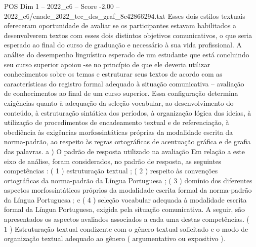 \begin{textsample}{POS Dim 1 – 2022\_c6 – Score -2.00 – 2022\_c6/enade\_2022\_tec\_des\_graf\_8c42866294.txt}
Esses dois estilos textuais ofereceram oportunidade de avaliar se os participantes estavam habilitados a desenvolverem textos com esses dois distintos objetivos comunicativos, o que seria esperado ao final do curso de graduação e necessário à sua vida profissional.
A análise do desempenho linguístico esperado de um estudante que está concluindo seu curso superior apoiou -se no princípio de que ele deveria utilizar conhecimentos sobre os temas e estruturar seus textos de acordo com as características do registro formal adequado à situação comunicativa – avaliação de conhecimentos ao final de um curso superior.
Essa configuração determina exigências quanto à adequação da seleção vocabular, ao desenvolvimento do conteúdo, à estruturação sintática dos períodos, à organização lógica das ideias, à utilização de procedimentos de encadeamento textual e de referenciação, à obediência às exigências morfossintáticas próprias da modalidade escrita da norma-padrão, ao respeito às regras ortográficas de acentuação gráfica e de grafia das palavras. a ) O padrão de resposta utilizado na avaliação Em relação a este eixo de análise, foram considerados, no padrão de resposta, as seguintes competências : ( 1 ) estruturação textual ; ( 2 ) respeito às convenções ortográficas da norma-padrão da Língua Portuguesa ; ( 3 ) domínio dos diferentes aspectos morfossintáticos próprios da modalidade escrita formal da norma-padrão da Língua Portuguesa ; e ( 4 ) seleção vocabular adequada à modalidade escrita formal da Língua Portuguesa, exigida pela situação comunicativa.
A seguir, são apresentados os aspectos avaliados associados a cada uma destas competências. ( 1 ) Estruturação textual condizente com o gênero textual solicitado e o modo de organização textual adequado ao gênero ( argumentativo ou expositivo ).

\end{textsample}
